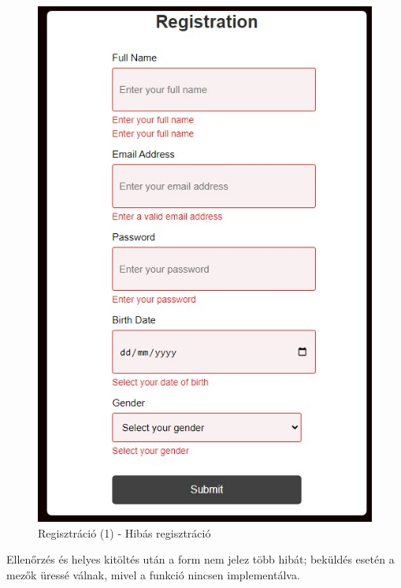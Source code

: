 \documentclass[12pt, titlepage]{article}
\begin{document}
\begin{figure}[!h]
	\centering
	\includegraphics[scale=0.7]{images/signup/1.jpg}
	\caption{Regisztráció (1) - Hibás regisztráció}
\end{figure}

Ellenőrzés és helyes kitöltés után a form nem jelez több hibát; beküldés esetén a mezők üressé válnak, mivel a funkció nincsen implementálva.
\end{document}
